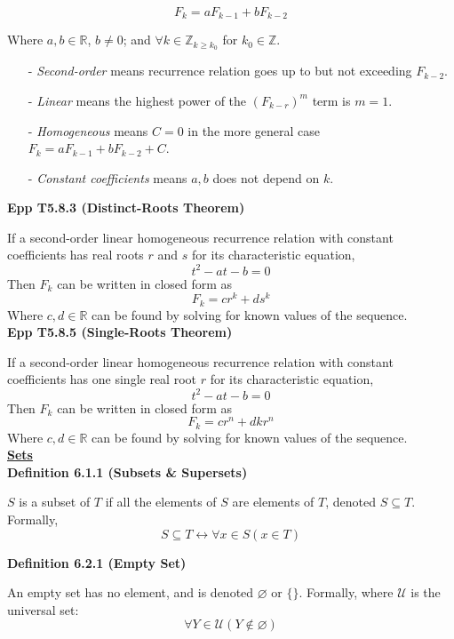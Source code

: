 \documentclass[a4paper]{article}
\newcommand{\heading}[1]{{\small\underline{\textbf{#1}}}}
\newcommand{\subheading}[1]{{\scriptsize\textbf{#1}}}
\begin{document}
\begin{multicols*}{4}
$$F_k = aF_{k-1} + bF_{k-2}$$

Where $a, b \in \mathbb{R}$, $b \neq 0$; and $\forall k \in \mathbb{Z}_{k \geq
k_0}$ for $k_0 \in \mathbb{Z}$.

\begin{itemize}[leftmargin=*] \itemsep -0.5em
\item[-] \textit{Second-order} means recurrence relation goes up to but not
  exceeding $F_{k-2}$.
\item[-] \textit{Linear} means the highest power of the $(F_{k-r})^m$ term is
  $m=1$.
\item[-] \textit{Homogeneous} means $C=0$ in the more general case $F_k =
  aF_{k-1} + bF_{k-2} + C$.
\item[-] \textit{Constant coefficients} means $a, b$ does not depend on $k$.
\end{itemize}

\subheading{Epp T5.8.3 (Distinct-Roots Theorem)}

If a second-order linear homogeneous recurrence relation with constant
coefficients has real roots $r$ and $s$ for its characteristic equation,
$$t^2 - at - b = 0$$
Then $F_k$ can be written in closed form as
$$F_k = cr^k + ds^k$$
Where $c, d \in \mathbb{R}$ can be found by solving for known values of the
sequence. \\

\subheading{Epp T5.8.5 (Single-Roots Theorem)}

If a second-order linear homogeneous recurrence relation with constant
coefficients has one single real root $r$ for its characteristic equation,
$$t^2 - at - b = 0$$
Then $F_k$ can be written in closed form as
$$F_k = cr^n + dkr^n$$
Where $c, d \in \mathbb{R}$ can be found by solving for known values of the
sequence. \\

\heading{Sets} \\

\subheading{Definition 6.1.1 (Subsets \& Supersets)}

$S$ is a subset of $T$ if all the elements of $S$ are elements of $T$, denoted
$S \subseteq T$. Formally, $$S \subseteq T \longleftrightarrow \forall x \in S
(x \in T)$$

\subheading{Definition 6.2.1 (Empty Set)}

An empty set has no element, and is denoted $\varnothing$ or $\{\}$. Formally,
where $\mathcal{U}$ is the universal set: $$\forall Y \in \mathcal{U} (Y \not\in
\varnothing)$$


\end{multicols*}
\end{document}
